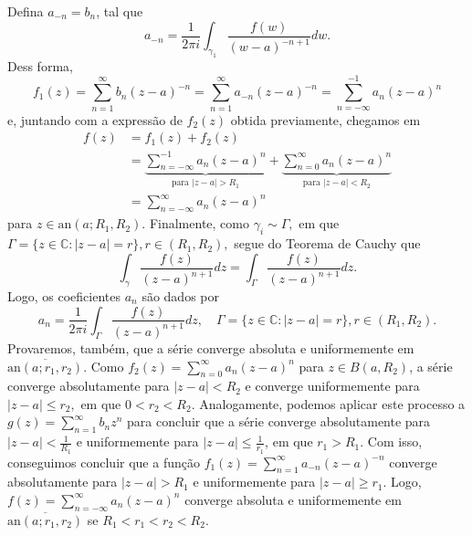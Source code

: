 \documentclass[ComplexAnalysis/complex.tex]{subfiles}
\begin{document}
\begin{proof*}
	Defina \(a_{-n}=b_{n}\), tal que
	\[
		a_{-n} = \frac{1}{2\pi i}\int_{\gamma _{1}}^{}\frac{f(w)}{(w-a)^{-n+1}}dw.
	\]
	Dess forma,
	\[
		f_{1}(z) = \sum\limits_{n=1}^{\infty}b_{n}(z-a)^{-n}=\sum\limits_{n=1}^{\infty}a_{-n}(z-a)^{-n}=\sum\limits_{n=-\infty}^{-1}a_{n}(z-a)^{n}
	\]
	e, juntando com a expressão de \(f_{2}(z)\) obtida previamente, chegamos em
	\begin{align*}
		f(z) & = f_{1}(z) + f_{2}(z)                                                                                                                                                   \\
		     & = \underbrace{\sum\limits_{n=-\infty}^{-1}a_{n}(z-a)^{n}}_{\text{para }|z-a|>R_{1}} + \underbrace{\sum\limits_{n=0}^{\infty}a_{n}(z-a)^{n}}_{\text{para }|z-a| < R_{2}} \\
		     & = \sum\limits_{n=-\infty}^{\infty}a_{n}(z-a)^{n}
	\end{align*}
	para \(z\in \mathrm{an}(a; R_{1}, R_{2}).\) Finalmente, como \(\gamma_{i}\sim\Gamma ,\) em que \(\Gamma =\{z\in \mathbb{C}:|z-a| = r\}, r\in (R_{1}, R_{2}),\) segue
	do Teorema de Cauchy que
	\[
		\int_{\gamma }^{}\frac{f(z)}{(z-a)^{n+1}}dz = \int_{\Gamma }^{}\frac{f(z)}{(z-a)^{n+1}}dz.
	\]
	Logo, os coeficientes \(a_{n}\) são dados por
	\[
		a_{n} = \frac{1}{2\pi i}\int_{\Gamma }^{}\frac{f(z)}{(z-a)^{n+1}}dz,\quad \Gamma = \{z\in \mathbb{C}:|z-a|=r\},r\in(R_{1},R_{2}).
	\]
	Provaremos, também, que a série converge absoluta e uniformemente em \(\overline{\mathrm{an}(a; r_{1}, r_{2})}\). Como \(f_2(z) = \sum\limits_{n=0}^{\infty}a_{n}(z-a)^{n}\) para \(z\in B(a, R_{2})\),
	a série converge absolutamente para \(|z-a| < R_{2}\) e converge uniformemente para \(|z-a|\leq r_{2},\) em que \(0 < r_{2} < R_{2}.\)
	Analogamente, podemos aplicar este processo a \(g(z) = \sum\limits_{n=1}^{\infty}b_{n}z^{n}\) para concluir que a série converge absolutamente para
	\(|z-a| < \frac{1}{R_{1}}\) e uniformemente para \(|z-a|\leq \frac{1}{r_{1}}\), em que \(r_{1} > R_{1}.\) Com isso, conseguimos concluir que a função
	\(f_{1}(z) = \sum\limits_{n=1}^{\infty}a_{-n}(z-a)^{-n}\) converge absolutamente para \(|z-a| > R_{1}\) e uniformemente para \(|z-a| \geq r_{1}.\) Logo,
	\(f(z) = \sum\limits_{n=-\infty}^{\infty}a_{n}(z-a)^{n}\) converge absoluta e uniformemente em \(\overline{\mathrm{an}(a; r_{1}, r_{2})}\) se \(R_{1} < r_{1} < r_{2} < R_{2}.\)


\end{proof*}
\end{document}
